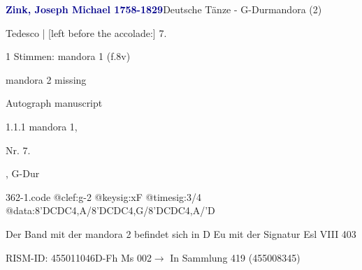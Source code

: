 \documentclass[twocolumn]{book}
\begin{document}
\par \vspace{7pt} \textcolor{darkblue}{\textbf{Zink, Joseph Michael  1758-1829}}\hfillplus{\textbf{[362]}}\newline Deutsche Tänze - G-Dur\newline mandora (2)
\par \begin{itshape}[f.8v, at left:] Tedesco | [left before the accolade:] 7.\end{itshape} 
\par \textcolor{darkblue}{}  1 Stimmen: mandora 1  (f.8v)\newline \begin{small} mandora 2 missing\end{small} \newline Autograph manuscript
\par 1.1.1  mandora 1, \begin{itshape}Nr. 7.\end{itshape}, G-Dur  
\begin{filecontents*}{362-1.code}
@clef:g-2
@keysig:xF
@timesig:3/4
@data:8'DCDC4,A/8'DCDC4,G/8'DCDC4,A/'D
\end{filecontents*}
\newline
%
\par Der Band mit der mandora 2 befindet sich in D Eu mit der Signatur Esl VIII 403
\par RISM-ID: 455011046\newline D-Fh  Ms 002\newline $\rightarrow$ In Sammlung 419 (455008345)
      
\end{document}
